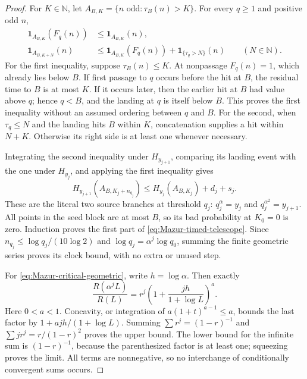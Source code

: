 \begin{proof}
For \(K\in\mathbb N\), let \(A_{B,K}=\{n\text{ odd}:\tau_B(n)>K\}\).
For every \(q\ge1\) and positive odd \(n\),
\begin{align}
 \mathbf1_{A_{B,K}}(F_q(n))&\le\mathbf1_{A_{B,K}}(n),\nonumber\\
 \mathbf1_{A_{B,K+N}}(n)&\le
 \mathbf1_{A_{B,K}}(F_q(n))+\mathbf1_{\{\tau_q>N\}}(n)
 \qquad(N\in\mathbb N).
 \label{eq:Mazur-timed-pointwise}
\end{align}
For the first inequality, suppose \(\tau_B(n)\le K\). At nonpassage
\(F_q(n)=1\), which already lies below \(B\).
If first passage to \(q\) occurs before the hit at \(B\), the residual
time to \(B\) is at most \(K\). If it occurs later, then the earlier
hit at \(B\) had value above \(q\); hence \(q<B\), and the landing
at \(q\) is itself below \(B\). This proves the first inequality
without an assumed ordering between \(q\) and \(B\).
For the second, when \(\tau_q\le N\) and the landing hits \(B\)
within \(K\), concatenation supplies a hit within \(N+K\).
Otherwise its right side is at least one whenever necessary.

Integrating the second inequality under \(H_{y_{j+1}}\),
comparing its landing event with the one under \(H_{y_j}\),
and applying the first inequality gives
\[
 H_{y_{j+1}}(A_{B,K_j+n_{q_j}})
 \le H_{y_j}(A_{B,K_j})+d_j+s_j.
\]
These are the literal two source branches at threshold \(q_j\):
\(q_j^\alpha=y_j\) and \(q_j^{\alpha^2}=y_{j+1}\).
All points in the seed block are at most \(B\), so its bad
probability at \(K_0=0\) is zero. Induction proves the first
part of \eqref{eq:Mazur-timed-telescope}.
Since \(n_{q_j}\le\log q_j/(10\log2)\) and
\(\log q_j=\alpha^j\log q_0\), summing the finite geometric
series proves its clock bound, with no extra or unused step.

For \eqref{eq:Mazur-critical-geometric}, write \(h=\log\alpha\).
Then exactly
\[
 \frac{R(\alpha^jL)}{R(L)}
 =r^j\left(1+\frac{jh}{1+\log L}\right)^a.
\]
Here \(0<a<1\). Concavity, or integration of
\(a(1+t)^{a-1}\le a\), bounds the last factor by
\(1+ajh/(1+\log L)\). Summing
\(\sum r^j=(1-r)^{-1}\) and
\(\sum jr^j=r/(1-r)^2\) proves the upper bound.
The lower bound for the infinite sum is \((1-r)^{-1}\),
because the parenthesized factor is at least one; squeezing
proves the limit. All terms are nonnegative, so no interchange
of conditionally convergent sums occurs.


\end{proof}
